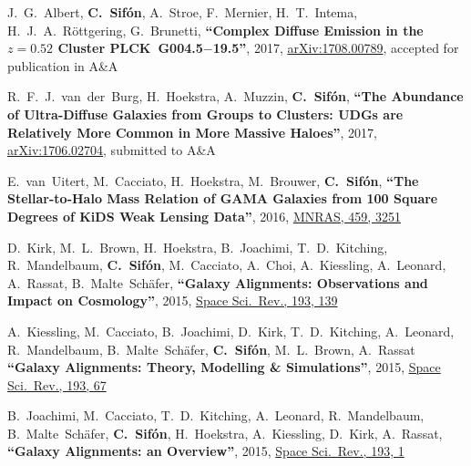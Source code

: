 \documentclass{article}
\def\myself{\textbf{\color{red} C.~Sif\'on}}
\def\aap{A\&A}
\def\mnras{MNRAS}
\def\ssr{Space Sci.\ Rev.}
\newcommand{\accepted}[1]{accepted for publication in #1}
\newcommand{\submitted}[1]{submitted to #1}
\newcommand{\paper}[1]{\textbf{``#1''}}
\begin{document}
\vspace{-0.5cm}
\begin{etaremune}

\item
J.~G.~Albert, \myself, A.~Stroe, F.~Mernier, H.~T.~Intema, H.~J.~A.~R\"ottgering, 
G.~Brunetti,
\paper{Complex Diffuse Emission in the $z=0.52$ Cluster PLCK~G004.5$-$19.5},
2017, \href{http://adsabs.harvard.edu/abs/2017arXiv17078.00789}{arXiv:1708.00789}, 
\accepted{\aap}

\item
R.~F.~J.~van~der~Burg, H.~Hoekstra, A.~Muzzin, \myself, 
\paper{The Abundance of Ultra-Diffuse Galaxies from Groups to Clusters: UDGs 
are Relatively More Common in More Massive Haloes},
2017, \href{http://adsabs.harvard.edu/abs/2017arXiv170602704V}{arXiv:1706.02704},
\submitted{\aap}

\item
E.~van~Uitert, M.~Cacciato, H.~Hoekstra, M.~Brouwer, \myself, 
\paper{The Stellar-to-Halo Mass Relation of GAMA Galaxies from 100 Square Degrees of KiDS Weak Lensing Data},
2016, \href{http://adsabs.harvard.edu/abs/2016MNRAS.459.3251V}{\mnras, 459, 3251}

\item
D.~Kirk, M.~L.~Brown, H.~Hoekstra, B.~Joachimi, T.~D.~Kitching, R.~Mandelbaum, \myself, 
M.~Cacciato, A.~Choi, A.~Kiessling, A.~Leonard, A.~Rassat, B.~Malte~Sch\"afer,
\paper{Galaxy Alignments: Observations and Impact on Cosmology},
2015, \href{http://adsabs.harvard.edu/doi/10.1007/s11214-015-0213-4}{\ssr, 193, 139}

\item
A.~Kiessling, M.~Cacciato, B.~Joachimi, D.~Kirk, T.~D.~Kitching, A.~Leonard, R.~Mandelbaum, 
B.~Malte~Sch\"afer, \myself, M.~L.~Brown, A.~Rassat
\paper{Galaxy Alignments: Theory, Modelling \& Simulations},
2015, \href{http://adsabs.harvard.edu/doi/10.1007/s11214-015-0203-6}{\ssr, 193, 67}

\item
B.~Joachimi, M.~Cacciato, T.~D.~Kitching, A.~Leonard, R.~Mandelbaum, B.~Malte~Sch\"afer, \myself, 
H.~Hoekstra, A.~Kiessling, D.~Kirk, A.~Rassat,
\paper{Galaxy Alignments: an Overview},
2015, \href{http://adsabs.harvard.edu/doi/10.1007/s11214-015-0177-4}{\ssr, 193, 1}


\end{etaremune}
\end{document}
